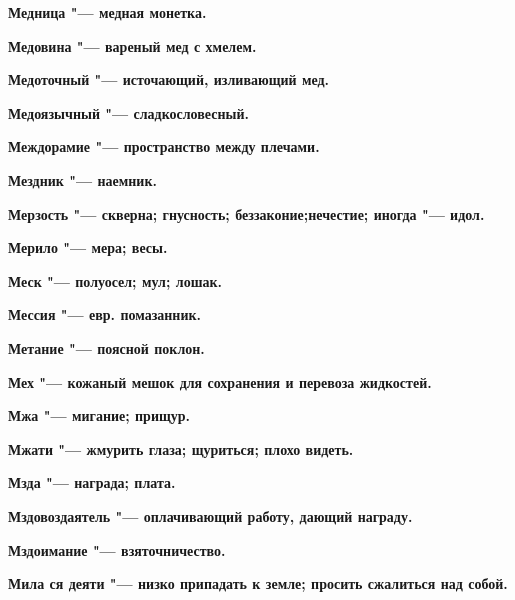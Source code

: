 \begin{mymulticols}{2}
\bfseries Медница\normalfont{} "--- медная монетка. 




\bfseries Медовина\normalfont{} "--- вареный мед с хмелем. 




\bfseries Медоточный\normalfont{} "--- источающий, изливающий мед. 




\bfseries Медоязычный\normalfont{} "--- сладкословесный. 




\bfseries Междорамие\normalfont{} "--- пространство между плечами. 




\bfseries Мездник\normalfont{} "--- наемник. 




\bfseries Мерзость\normalfont{} "--- скверна; гнусность; беззаконие;нечестие; иногда "--- идол. 




\bfseries Мерило\normalfont{} "--- мера; весы. 




\bfseries Меск\normalfont{} "--- полуосел; мул; лошак. 




\bfseries Мессия\normalfont{} "--- евр. помазанник. 




\bfseries Метание\normalfont{} "--- поясной поклон. 




\bfseries Мех\normalfont{} "--- кожаный мешок для сохранения и перевоза жидкостей. 




\bfseries Мжа\normalfont{} "--- мигание; прищур. 




\bfseries Мжати\normalfont{} "--- жмурить глаза; щуриться; плохо видеть. 




\bfseries Мзда\normalfont{} "--- награда; плата. 




\bfseries Мздовоздаятель\normalfont{} "--- оплачивающий работу, дающий награду. 




\bfseries Мздоимание\normalfont{} "--- взяточничество. 




\bfseries Мила ся деяти\normalfont{} "--- низко припадать к земле; просить сжалиться над собой. 





\end{mymulticols}

